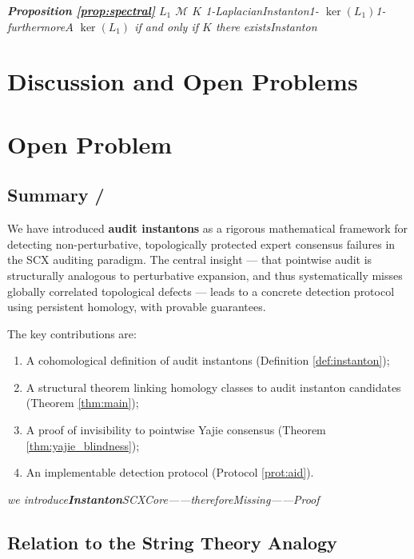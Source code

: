 \documentclass[11pt,a4paper]{article}
\theoremstyle{plain}
\theoremstyle{definition}
\newcommand{\cM}{\mathcal{M}}
\begin{document}
\bigskip
\noindent
\textit{\textbf{Proposition \ref{prop:spectral}} $L_1$  $\cM$  $K$ 1-LaplacianInstanton1- $\ker(L_1)$1-furthermore$A$  $\ker(L_1)$ if and only if $K$ there existsInstanton}

\section{Discussion and Open Problems}
\section*{Open Problem}

\subsection{Summary / }

We have introduced \textbf{audit instantons} as a rigorous mathematical 
framework for detecting non-perturbative, topologically protected expert 
consensus failures in the SCX auditing paradigm. The central insight — 
that pointwise audit is structurally analogous to perturbative expansion, 
and thus systematically misses globally correlated topological defects — 
leads to a concrete detection protocol using persistent homology, with 
provable guarantees.

The key contributions are:
\begin{enumerate}[label=(\arabic*)]
  \item A cohomological definition of audit instantons (Definition \ref{def:instanton});
  \item A structural theorem linking homology classes to audit instanton 
        candidates (Theorem \ref{thm:main});
  \item A proof of invisibility to pointwise Yajie consensus (Theorem \ref{thm:yajie_blindness});
  \item An implementable detection protocol (Protocol \ref{prot:aid}).
\end{enumerate}

\bigskip
\noindent
\textit{we introduce\textbf{Instanton}SCXCore——thereforeMissing——Proof}

\subsection{Relation to the String Theory Analogy}
\end{document}
